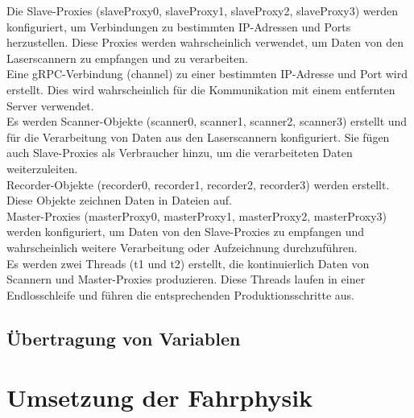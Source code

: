 Die Slave-Proxies (slaveProxy0, slaveProxy1, slaveProxy2, slaveProxy3) werden konfiguriert, um Verbindungen zu bestimmten IP-Adressen und Ports herzustellen. Diese Proxies werden wahrscheinlich verwendet, um Daten von den Laserscannern zu empfangen und zu verarbeiten.\\

Eine gRPC-Verbindung (channel) zu einer bestimmten IP-Adresse und Port wird erstellt. Dies wird wahrscheinlich für die Kommunikation mit einem entfernten Server verwendet.\\

Es werden Scanner-Objekte (scanner0, scanner1, scanner2, scanner3) erstellt und für die Verarbeitung von Daten aus den Laserscannern konfiguriert. Sie fügen auch Slave-Proxies als Verbraucher hinzu, um die verarbeiteten Daten weiterzuleiten.\\

Recorder-Objekte (recorder0, recorder1, recorder2, recorder3) werden erstellt. Diese Objekte zeichnen Daten in Dateien auf.\\

Master-Proxies (masterProxy0, masterProxy1, masterProxy2, masterProxy3) werden konfiguriert, um Daten von den Slave-Proxies zu empfangen und wahrscheinlich weitere Verarbeitung oder Aufzeichnung durchzuführen.\\

Es werden zwei Threads (t1 und t2) erstellt, die kontinuierlich Daten von Scannern und Master-Proxies produzieren. Diese Threads laufen in einer Endlosschleife und führen die entsprechenden Produktionsschritte aus.\\

\subsection{Übertragung von Variablen}


\section{Umsetzung der Fahrphysik}
